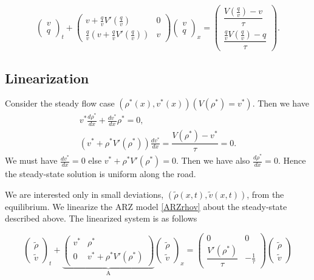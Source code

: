 \documentclass[review]{elsarticle}
\begin{document}
\begin{equation} \label{ARZvq}
\begin{pmatrix}
v \\ q
\end{pmatrix}_t
+ \begin{pmatrix}
v + \frac{q}{v} V'\left(\frac{q}{v}\right) & 0 \\
\frac{q}{v} \left( v + \frac{q}{v} V'\left(\frac{q}{v}\right)\right) & v
\end{pmatrix}
\begin{pmatrix}
v \\ q
\end{pmatrix}_x = 
\begin{pmatrix}
\dfrac{V\left( \frac{q}{v}\right) - v}{\tau} \\ 
\dfrac{\frac{q}{v}V\left( \frac{q}{v}\right) - q}{\tau}
\end{pmatrix}.
\end{equation}


\subsection{Linearization}
Consider the steady flow case $(\rho^*(x),v^*(x))(V(\rho^*) = v^*)$. Then we have
\begin{align}
v^* \frac{d\rho^*}{dx} + \frac{dv^*}{dx}\rho^* = 0, \\
\left( v^* + \rho^* V'( \rho^*) \right)\frac{dv^*}{dx} = \dfrac{V(\rho^*) - v^*}{\tau} = 0.
\end{align}
We must have $\frac{dv^*}{dx}=0$ else $v^* + \rho^* V'( \rho^*) = 0$. Then we have also $\frac{d\rho^*}{dx} = 0$. Hence the steady-state solution is uniform along the road. 

We are interested only in small deviations, $(\tilde{\rho}(x,t), \tilde{v}(x,t))$, from the equilibrium. We linearize the ARZ model \eqref{ARZrhov} about the steady-state described above. The linearized system is as follows 

\begin{equation} \label{rhovlin}
\begin{pmatrix}
\tilde{\rho} \\ \tilde{v}
\end{pmatrix}_t
+ \underbrace{\begin{pmatrix}
v^* & \rho^* \\
0 & v^* + \rho^* V' ( \rho^*) 
\end{pmatrix}}_\text{A}
\begin{pmatrix}
\tilde{\rho} \\ \tilde{v}
\end{pmatrix}_x = 
\begin{pmatrix}
0 & 0 \\
\dfrac{V' (\rho^*)}{\tau} & -\frac{1}{\tau}
\end{pmatrix}
\begin{pmatrix}
\tilde{\rho} \\ \tilde{v}
\end{pmatrix}
\end{equation}
\end{document}
